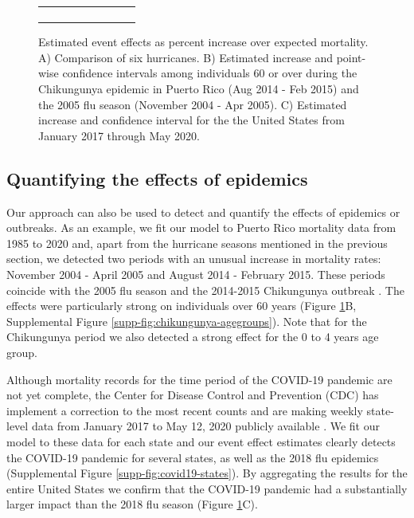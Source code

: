 \documentclass[11pt]{article}
\begin{document}
\begin{figure}[ht]
\begin{tabular}{lll}
\begin{subfigure}[t]{0.30\linewidth}
	\end{subfigure}\\
    \end{tabular}
    \caption{Estimated event effects as percent increase over expected mortality. A) Comparison of six hurricanes. B) Estimated increase and point-wise confidence intervals among individuals 60 or over during the Chikungunya epidemic in Puerto Rico (Aug 2014 - Feb 2015) and the 2005 flu season (November 2004 - Apr 2005). C) Estimated increase and confidence interval for the the United States from January 2017 through May 2020.}
    \label{fig:fhat-estimates}
\end{figure}

\subsection{Quantifying the effects of epidemics}
\label{subsec:epidemics}
Our approach can also be used to detect and quantify the effects of epidemics or outbreaks. As an example, we fit our model to Puerto Rico mortality data from 1985 to 2020 and, apart from the hurricane seasons mentioned in the previous section, we detected two periods with an unusual increase in mortality rates: November 2004 - April 2005 and August 2014 - February 2015. These periods coincide with the 2005 flu season and the 2014-2015 Chikungunya outbreak \cite{sharp2016surveillance, hsu2019risk}. The effects were particularly strong on individuals over 60 years (Figure \ref{fig:fhat-estimates}B, Supplemental Figure \ref{supp-fig:chikungunya-agegroups}). Note that for the Chikungunya period we also detected a strong effect for the  0 to 4 years age group. 

Although mortality records for the time period of the COVID-19 pandemic are not yet complete, the Center for Disease Control and Prevention (CDC) has implement a correction to the most recent counts and are making weekly state-level data from January 2017 to May 12, 2020 publicly available \cite{cdc2020covid19}. We fit our model to these data for each state and our event effect estimates clearly detects the COVID-19 pandemic for several states, as well as the 2018 flu epidemics (Supplemental Figure \ref{supp-fig:covid19-states}). By aggregating the results for the entire United States we confirm that the COVID-19 pandemic had a substantially larger impact than the 2018 flu season
(Figure \ref{fig:fhat-estimates}C).
 
\end{document}
